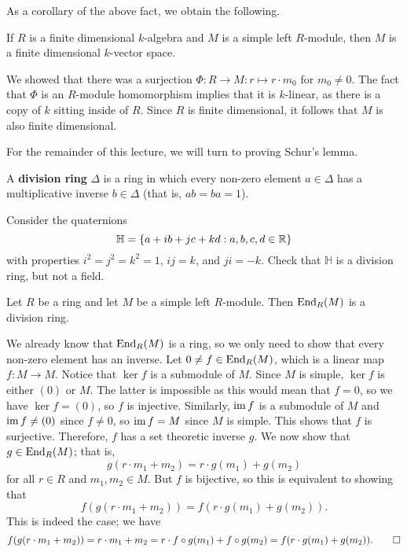 As a corollary of the above fact, we obtain the following. 

\begin{cor}
If $R$ is a finite dimensional $k$-algebra and $M$ is a simple left $R$-module, then $M$ is a 
finite dimensional $k$-vector space.
\end{cor}

\begin{pf}
We showed that there was a surjection $\Phi : R \to M : r \mapsto r \cdot m_0$
for $m_0 \neq 0$. The fact that $\Phi$ is an $R$-module homomorphism implies that it is $k$-linear, 
as there is a copy of $k$ sitting inside of $R$. Since $R$ is finite dimensional, it follows that 
$M$ is also finite dimensional.
\end{pf}

For the remainder of this lecture, we will turn to proving Schur's lemma. 

\begin{defn}
A {\bf division ring} $\Delta$ is a ring in which every non-zero element $a \in \Delta$ 
has a multiplicative inverse $b \in \Delta$ (that is, $ab = ba = 1$).
\end{defn}

\begin{exmp}
Consider the quaternions 
\[ \mathbb{H} = \{a + ib + jc + kd : a, b, c, d \in \mathbb{R}\} \]
with properties 
$i^2 = j^2 = k^2 = 1$, $ij = k$, and $ji = -k$. Check that $\mathbb{H}$ is a division ring, 
but not a field.
\end{exmp}

\begin{thm}
Let $R$ be a ring and let $M$ be a simple left $R$-module. Then $\operatorname{End}_R(M)$ is a division ring.
\end{thm}
\begin{pf}
We already know that $\operatorname{End}_R(M)$ is a ring, so we only need to show that every non-zero element 
has an inverse. Let $0 \neq f \in \operatorname{End}_R(M)$, which is a linear map $f : M \to M$. Notice that 
$\ker f$ is a submodule of $M$. Since $M$ is simple, $\ker f$ is either $(0)$ or $M$. The latter 
is impossible as this would mean that $f = 0$, so we have $\ker f = (0)$, so $f$ is injective. 
Similarly, $\operatorname{im} f$ is a submodule of $M$ and $\operatorname{im} f \neq (0)$ since $f \neq 0$, so 
$\operatorname{im} f = M$ since $M$ is simple. This shows that $f$ is surjective. Therefore, $f$ has a 
set theoretic inverse $g$. We now show that $g \in \operatorname{End}_R(M)$; that is, 
\[ g(r \cdot m_1 + m_2) = r \cdot g(m_1) + g(m_2) \]
for all $r \in R$ and $m_1, m_2 \in M$. But $f$ is bijective, so this is equivalent to showing that 
\[ f(g(r \cdot m_1 + m_2)) = f(r \cdot g(m_1) + g(m_2)). \]
This is indeed the case; we have 
\[ f(g(r \cdot m_1 + m_2)) = r \cdot m_1 + m_2 = r \cdot f \circ g(m_1) + f \circ g(m_2) = f(r \cdot g(m_1) + g(m_2)). \qedhere \]
\end{pf}

